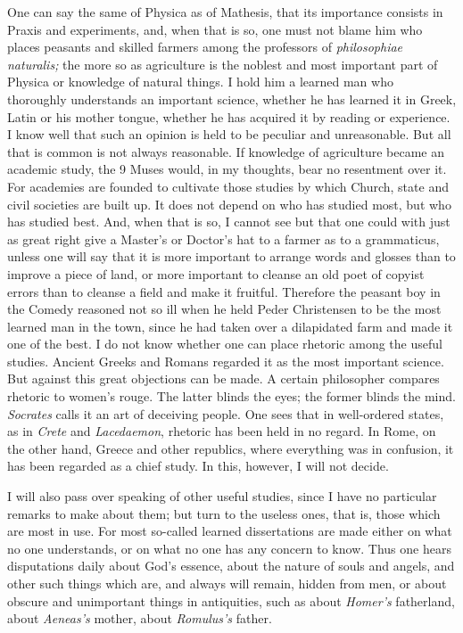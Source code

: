\documentclass[12pt,a4paper,openany]{book}
\newcommand{\opage}[1]{\marginnote{\footnotesize\textit{[#1]}}}
\begin{document}
One can say the same of Physica as of Mathesis, that its importance consists in
Praxis and experiments, and, when that is so, one must not blame him who places
peasants and skilled farmers among the professors of \textit{philosophiae
naturalis;} the more so as agriculture is the noblest and most important part of
Physica or knowledge of natural things. I
\setcounter{footnote}{0}%
\opage{22}hold him a learned man who thoroughly understands an important science,
whether he has learned it in Greek, Latin or his mother tongue, whether he has
acquired it by reading or experience. I know well that such an opinion is held to
be peculiar and unreasonable. But all that is common is not always reasonable.
If knowledge of agriculture became an academic study, the 9 Muses would, in my
thoughts, bear no resentment over it. For academies are founded to cultivate those
studies by which Church, state and civil societies are built up. It does not
depend on who has studied most, but who has studied best. And, when that is so, I
cannot see but that one could with just as great right give a Master's or
Doctor's hat to a farmer as to a grammaticus, unless one will say that it is more
important to arrange words and glosses than to improve a piece of land, or more
important to cleanse an old poet of copyist errors than to cleanse a field and
make it fruitful. Therefore the peasant boy in the Comedy reasoned not so ill when
he held Peder Christensen to be the most learned man in the town, since he had
taken over a dilapidated farm and made it one of the best. I do not know whether
one can place rhetoric among the useful studies. Ancient Greeks and Romans
regarded it as the most important science. But against this great objections can
be made. A certain philosopher compares rhetoric to women's rouge. The latter
blinds the eyes; the former blinds the mind. \textit{Socrates} calls it an art of
deceiving people. One sees that in well-ordered states, as in \textit{Crete} and
\textit{Lacedaemon}, rhetoric has been held in no regard. In Rome, on the other
hand, Greece and other republics, where everything was in confusion, it has been
regarded as a chief study. In this, however, I will not decide.

I will also pass over speaking of other useful studies, since I have no particular
remarks to make about them; but turn to the useless ones, that is, those which are
most
\setcounter{footnote}{0}%
\opage{23}in use. For most so-called learned dissertations are made either on what no
one understands, or on what no one has any concern to know. Thus one hears
disputations daily about God's essence, about the nature of souls and angels, and
other such things which are, and always will remain, hidden from men, or about
obscure and unimportant things in antiquities, such as about \textit{Homer's}
fatherland, about \textit{Aeneas's} mother, about \textit{Romulus's} father.
\end{document}
